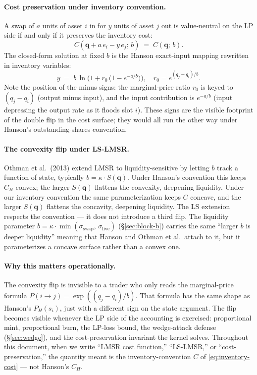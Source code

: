 \documentclass[11pt]{article}
\newcommand{\Sm}{S(\mathbf{q})}
\begin{document}
\paragraph{Cost preservation under inventory convention.}
A swap of $a$ units of asset $i$ in for $y$ units of asset $j$ out
is value-neutral on the LP side if and only if it preserves the
inventory cost:
\begin{equation}
  \label{eq:cost-preserve}
  C(\mathbf{q} + a\,e_i - y\,e_j;\,b)
  \;=\;
  C(\mathbf{q};\,b).
\end{equation}
The closed-form solution at fixed $b$ is the Hanson exact-input
mapping rewritten in inventory variables:
\begin{equation}
  y \;=\; b\,\ln\!\Big(1 + r_0\,\big(1 - e^{-a/b}\big)\Big),
  \quad
  r_0 = e^{(q_j - q_i)/b}.
\end{equation}
Note the position of the minus signs: the marginal-price ratio $r_0$
is keyed to $(q_j - q_i)$ (output minus input), and the input
contribution is $e^{-a/b}$ (input depressing the output rate as it
floods slot $i$). These signs are the visible footprint of the double
flip in the cost surface; they would all run the other way under
Hanson's outstanding-shares convention.

\paragraph{The convexity flip under LS-LMSR.}
Othman et al.\ (2013) extend LMSR to liquidity-sensitive by letting
$b$ track a function of state, typically $b = \kappa \cdot \Sm$. Under
Hanson's convention this keeps $C_H$ convex; the larger $\Sm$ flattens
the convexity, deepening liquidity. Under our inventory convention
the same parameterization keeps $C$ concave, and the larger $\Sm$
flattens the concavity, deepening liquidity. The LS extension
respects the convention --- it does not introduce a third flip. The
liquidity parameter $b = \kappa \cdot \min(\sigma_{\mathrm{swap}},\,
\sigma_{\mathrm{live}})$ (\S\ref{sec:block-b}) carries the same
``larger $b$ is deeper liquidity'' meaning that Hanson and Othman et
al.\ attach to it, but it parameterizes a concave surface rather than
a convex one.

\paragraph{Why this matters operationally.}
The convexity flip is invisible to a trader who only reads the
marginal-price formula $P(i \to j) = \exp((q_j - q_i)/b)$. That
formula has the same shape as Hanson's $P_H(s_i)$, just with a different
sign on the state argument. The flip becomes visible whenever the LP
side of the accounting is exercised: proportional mint, proportional
burn, the LP-loss bound, the wedge-attack defense
(\S\ref{sec:wedge}), and the cost-preservation invariant the kernel
solves. Throughout this document, when we write ``LMSR cost
function,'' ``LS-LMSR,'' or ``cost-preservation,'' the quantity meant
is the inventory-convention $C$ of \eqref{eq:inventory-cost} --- not
Hanson's $C_H$.
\end{document}
